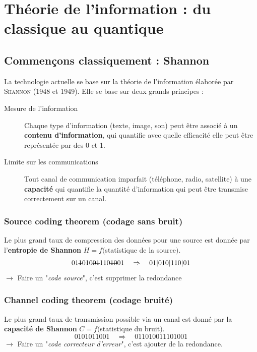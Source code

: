 \section{Théorie de l'information : du classique au quantique}
\subsection{Commençons classiquement : Shannon}
La technologie actuelle se base sur la théorie de l'information élaborée par 
\textsc{Shannon} (1948 et 1949). Elle se base sur deux grands principes :
\begin{description}
\item[Mesure de l'information] Chaque type d'information (texte, image, son) peut être 
associé à un \textbf{contenu d'information}, qui quantifie avec quelle efficacité
elle peut être représentée par des 0 et 1.
\item[Limite sur les communications] Tout canal de communication imparfait (téléphone, 
radio, satellite) à une \textbf{capacité} qui quantifie la quantité d'information qui 
peut être transmise correctement sur un canal.
\end{description}

\subsubsection{Source coding theorem (codage sans bruit)}
Le plus grand taux de compression des données pour une source est donnée par 
l'\textbf{entropie de Shannon} $H=f($statistique de la source$)$.
\begin{equation}
01\text{\st{1}}010\text{\st{01}}110\text{\st{10}}01\quad\Rightarrow\quad 01|010|110|01
\end{equation}
$\to$ Faire un "\textit{code source}", c'est supprimer la redondance

\subsubsection{Channel coding theorem (codage bruité)}
Le plus grand taux de transmission possible via un canal est donné par la 
\textbf{capacité de Shannon} $C=f($statistique du bruit$)$.
\begin{equation}
0101011001\quad\Rightarrow\quad 011010011101001
\end{equation}
$\to$ Faire un "\textit{code correcteur d'erreur}", c'est ajouter de la redondance.


